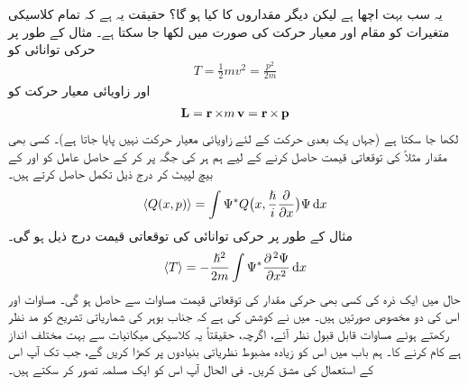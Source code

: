 یہ سب بہت اچھا ہے  لیکن دیگر مقداروں کا کیا ہو گا؟ حقیقت یہ ہے کہ تمام کلاسیکی متغیرات کو مقام اور معیار حرکت کی صورت میں لکھا جا سکتا ہے۔ مثال کے طور پر حرکی توانائی کو
\begin{align*}
T=\frac{1}{2}mv^{2}=\frac{p^{2}}{2m}
\end{align*}
اور زاویائی معیار حرکت کو 
\begin{align*}
\operatorname{\mathbf{L}}=\operatorname{\mathbf{r}}\times m\operatorname{\mathbf{v}}=\operatorname{\mathbf{r}}\times \operatorname{\mathbf{p}}
\end{align*}
لکھا جا سکتا ہے (جہاں یک بعدی حرکت کے لئے  زاویائی معیار حرکت نہیں پایا جاتا ہے)۔ کسی بھی مقدار مثلاً  کی توقعاتی قیمت  حاصل کرنے کے لیے ہم ہر   کی جگہ  پر کر کے حاصل عامل کو  اور  کے بیچ لپیٹ کر درج ذیل تکمل حاصل کرتے ہیں۔
\begin{align}\label{مساوات_تفاعل_موج_توقعاتی_قیمت_حصول}
\langle Q(x,p) \rangle=\int \Psi^*Q\big (x,\frac{\hslash}{i}\frac{\partial}{\partial{x}}\big )\Psi \dif{x}
\end{align}
مثال کے طور پر حرکی توانائی کی توقعاتی قیمت درج ذیل ہو گی۔
\begin{align}
\langle T \rangle=-\frac{\hslash ^{2}}{2m}\int \Psi^*\frac{\partial^{\,2}\Psi}{\partial{x^{2}}}\dif{x}
\end{align}
حال  میں ایک ذرہ کی کسی بھی حرکی مقدار کی توقعاتی قیمت  مساوات   سے حاصل ہو گی۔
مساوات  اور   اس کی دو مخصوص صورتیں ہیں۔ میں نے کوشش کی ہے کہ جناب بوہر کی شماریاتی تشریح کو مد نظر رکھتے ہوئے   مساوات   قابل قبول نظر آئے، اگرچہ، حقیقتاً یہ کلاسیکی میکانیات سے بہت مختلف انداز ہے کام کرنے کا۔ ہم باب   میں اس کو زیادہ مضبوط نظریاتی بنیادوں پر کھڑا کریں گے، جب تک آپ اس کے استعمال  کی مشق کریں۔ فی الحال آپ اس کو ایک مسلمہ تصور کر سکتے ہیں۔

